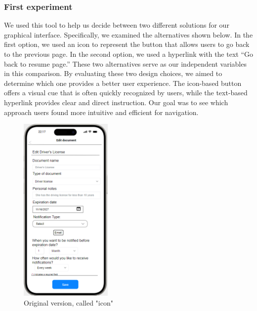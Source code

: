		\subsubsection{First experiment}
		We used this tool to help us decide between two different solutions for our graphical interface. Specifically, we examined the alternatives shown below. In the first option, we used an icon to represent the button that allows users to go back to the previous page. In the second option, we used a hyperlink with the text “Go back to resume page.” These two alternatives serve as our independent variables in this comparison.\newline
		By evaluating these two design choices, we aimed to determine which one provides a better user experience. The icon-based button offers a visual cue that is often quickly recognized by users, while the text-based hyperlink provides clear and direct instruction. Our goal was to see which approach users found more intuitive and efficient for navigation.
			\begin{figure}[htbp]
				\centering
				\includegraphics[width=0.4\textwidth]{../mockups/edit_variant.png}  %
				\caption{Original version, called "icon"}
			\end{figure}
			\clearpage

